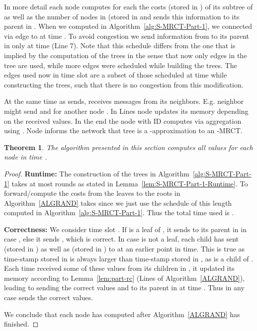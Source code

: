 \documentclass[11pt]{article}
\newtheorem{theorem}{Theorem}[section]
\begin{document}
In more detail each node  computes for each  the costs  (stored in ) of its subtree of  as well as the number of nodes in  (stored in  and sends this information to its parent in . When we computed  in Algorithm~\ref{alg:S-MRCT-Part-1}, we connected  via edge  to  at time . To avoid congestion we send information from  to its parent in  only at time  (Line 7). Note that this schedule differs from the one that is implied by the computation of the trees in the sense that now only edges in the tree are used, while more edges were scheduled while building the trees. The edges used now in time slot  are a subset of those scheduled at time  while constructing the trees, such that there is no congestion from this modification.   


At the same time as  sends,  receives messages from its neighbors. E.g. neighbor  might send  and  for another node . In Lines  node  updates its memory depending on the received values. In the end the node with ID  computes  via aggregation using . Node  informs the network that tree  is a -approximation to an -MRCT.
\begin{theorem}\label{thm:exact_RC}
The algorithm presented in this section computes all  values  for each node  in time .
\end{theorem}
\begin{proof}
\textbf{Runtime:} The construction of the  trees in Algorithm~\ref{alg:S-MRCT-Part-1} takes at most  rounds as stated in Lemma~\ref{lem:S-MRCT-Part-1-Runtime}. To forward/compute the costs from the leaves to the roots  in Algorithm~\ref{ALGRAND} takes  since we just use the schedule  of this length computed in Algorithm~\ref{alg:S-MRCT-Part-1}. Thus the total time used is .

\textbf{Correctness:} 
We consider time slot . If  is a leaf of , it sends  to its parent in  in case , else it sends , which is correct. In case  is not a leaf, each child  has sent  (stored in ) as well as  (stored in ) to  at an earlier point in time. This is true as time-stamp  stored in  is always larger than time-stamp  stored in , as  is a child of . Each time  received some of these values from its children in , it updated its memory according to Lemma~\ref{lem:part-rc} (Lines  of Algorithm~\ref{ALGRAND}), leading to sending the correct values  and  to its parent in  at time . Thus in any case  sends the correct values.

We conclude that each node  has computed  after Algorithm~\ref{ALGRAND} has finished. 
\end{proof}
\end{document}
